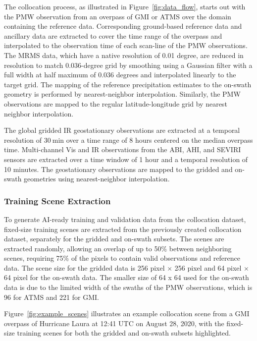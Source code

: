 \documentclass[11pt]{article}
\begin{document}
The collocation process, as illustrated in Figure~\ref{fig:data_flow}, starts
out with the PMW observation from an overpass of GMI or ATMS over the domain
containing the reference data. Corresponding ground-based reference data and
ancillary data are extracted to cover the time range of the overpass and
interpolated to the observation time of each scan-line of the PMW observations.
The MRMS data, which have a native resolution of 0.01 degree, are reduced in
resolution to match 0.036-degree grid by smoothing using a Gaussian filter with
a full width at half maximum of 0.036 degrees and interpolated linearly to the
target grid. The mapping of the reference precipitation estimates to the
on-swath geometry is performed by nearest-neighbor interpolation. Similarly, the
PMW observations are mapped to the regular latitude-longitude grid by nearest
neighbor interpolation.

The global gridded IR geostationary observations are extracted at a temporal
resolution of $\SI{30}{\minute}$ over a time range of 8 hours centered on the
median overpass time. Multi-channel Vis and IR observations from the ABI, AHI,
and SEVIRI sensors are extracted over a time window of 1 hour and a temporal
resolution of 10 minutes. The geostationary observations are mapped to the
gridded and on-swath geometries using nearest-neighbor interpolation.

\subsubsection{Training Scene Extraction}

To generate AI-ready training and validation data from the collocation dataset,
fixed-size training scenes are extracted from the previously created collocation
dataset, separately for the gridded and on-swath subsets. The scenes are
extracted randomly, allowing an overlap of up to 50\% between neighboring
scenes, requiring 75\% of the pixels to contain valid observations and reference
data. The scene size for the gridded data is 256 pixel $\times$ 256 pixel and 64
pixel $\times$ 64 pixel for the on-swath data. The smaller size of 64 x 64 used
for the on-swath data is due to the limited width of the swaths of the PMW
observations, which is 96 for ATMS and 221 for GMI.

Figure~\ref{fig:example_scenes} illustrates an example collocation scene from a
GMI overpass of Hurricane Laura at 12:41 UTC on August 28, 2020, with the
fixed-size training scenes for both the gridded and on-swath subsets
highlighted.
\end{document}
